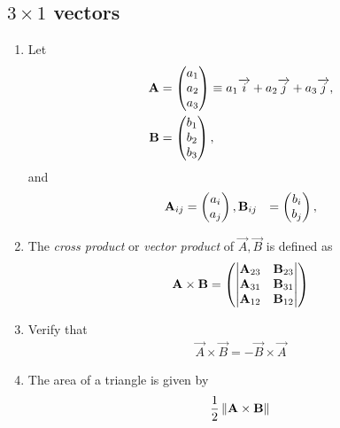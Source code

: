 \documentclass[journal,12pt,onecolumn]{IEEEtran}
\renewcommand\thesection{\arabic{section}}
\renewcommand\thesubsection{\thesection.\arabic{subsection}}
\begin{document}
\subsection{$3\times 1$ vectors}
\renewcommand{\theequation}{\theenumi}
\begin{enumerate}[label=\thesubsection.\arabic*.,ref=\thesubsection.\theenumi]

\item Let 
\begin{align}
  \mathbf{A} &= \begin{pmatrix}a_1\\a_2 \\ a_3\end{pmatrix} \equiv a_1\overrightarrow{i}+a_2\overrightarrow{j}+a_3\overrightarrow{j}, 
  \\
  \mathbf{B} &= \begin{pmatrix}b_1\\b_2 \\ b_3\end{pmatrix}, 
\end{align}
and 
\begin{align}
  \mathbf{A}_{ij} &= \begin{pmatrix}a_i\\a_j\end{pmatrix}, 
  \mathbf{B}_{ij} &= \begin{pmatrix}b_i\\b_j\end{pmatrix}, 
\end{align}

\item The {\em cross product} or {\em vector product} of $\vec{A}, \vec{B}$ is defined as
\begin{align}
  \label{eq:cross3d}
	\mathbf{A} \times \mathbf{B} = \begin{pmatrix} \begin{vmatrix}\mathbf{A}_{23} & \mathbf{B}_{23}\end{vmatrix} \\ \begin{vmatrix}\mathbf{A}_{31} & \mathbf{B}_{31}\end{vmatrix} \\ \begin{vmatrix}\mathbf{A}_{12}  & \mathbf{B}_{12}\end{vmatrix}\end{pmatrix}
\end{align}
\item Verify that
\begin{align}
  \vec{A} \times \vec{B} = -  \vec{B} \times \vec{A} 
\end{align}
\item The area of a triangle is given by 
\begin{align}
	\frac{1}{2} \left\lVert  \mathbf{A} \times \mathbf{B}\right\rVert
\end{align}
\end{enumerate}
\end{document}
